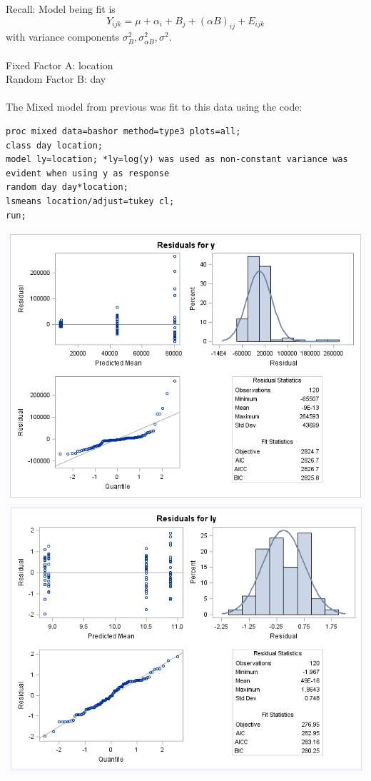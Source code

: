 Recall:  Model being fit is 
$$Y_{ijk} = \mu + \alpha_i + B_j + (\alpha B)_{ij} + E_{ijk}$$
with variance components $\sigma_B^2, \sigma_{\alpha B}^2, \sigma^2$.\\~\\
Fixed Factor A: location \\
Random Factor B: day\\~\\

The Mixed model from previous was fit to this data using the code:\\
\begin{small}
\begin{verbatim}
proc mixed data=bashor method=type3 plots=all;
class day location;
model ly=location; *ly=log(y) was used as non-constant variance was evident when using y as response
random day day*location;
lsmeans location/adjust=tukey cl;
run;
\end{verbatim}
\end{small}

\begin{center}
\includegraphics[scale=0.7]{Campy1}\\\includegraphics[scale=0.7]{Campy2}
\end{center}

